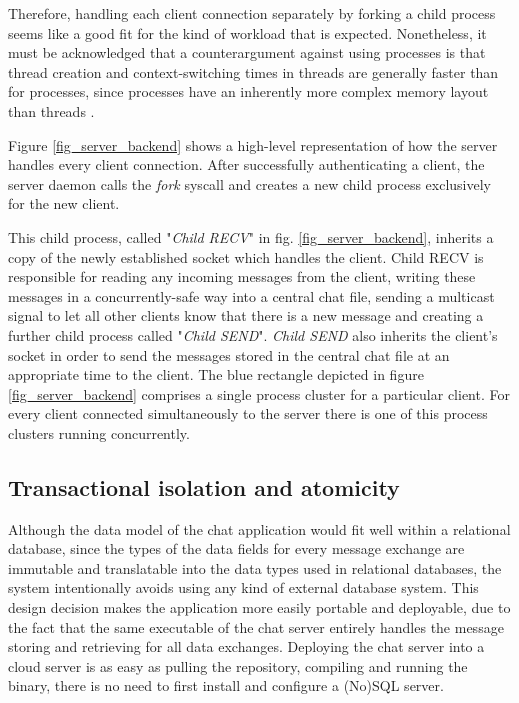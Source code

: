 Therefore, handling each client connection separately by forking a child process seems like a good fit for the kind of workload that is expected. Nonetheless, it must be acknowledged that a counterargument against using processes is that thread creation and context-switching times in threads are generally faster than for processes, since processes have an inherently more complex memory layout than threads \cite{Kerrisk2010}.

Figure \ref{fig_server_backend} shows a high-level representation of how the server handles every client connection. After successfully authenticating a client, the server daemon calls the \textit{fork} syscall and creates a new child process exclusively for the new client.
 
This child process, called "\textit{Child RECV}" in fig. \ref{fig_server_backend}, inherits a copy of the newly established socket which handles the client. Child RECV is responsible for reading any incoming messages from the client, writing these messages in a concurrently-safe way into a central chat file, sending a multicast signal to let all other clients know that there is a new message and creating a further child process called "\textit{Child SEND}". \textit{Child SEND} also inherits the client's socket in order to send the messages stored in the central chat file at an appropriate time to the client. The blue rectangle depicted in figure \ref{fig_server_backend} comprises a single process cluster for a particular client. For every client connected simultaneously to the server there is one of this process clusters running concurrently.

\subsection{Transactional isolation and atomicity}
Although the data model of the chat application would fit well within a relational database, since the types of the data fields for every message exchange are immutable and translatable into the data types used in relational databases, the system intentionally avoids using any kind of external database system. This design decision makes the application more easily portable and deployable, due to the fact that the same executable of the chat server entirely handles the message storing and retrieving for all data exchanges. Deploying the chat server into a cloud server is as easy as pulling the repository, compiling and running the binary, there is no need to first install and configure a (No)SQL server.

